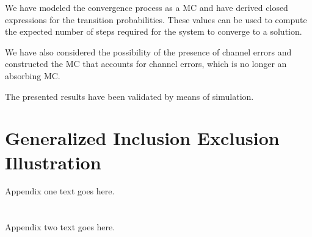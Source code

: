 \documentclass[journal]{IEEEtran}
\begin{document}
We have modeled the convergence process as a MC and have derived closed expressions for the transition probabilities.
These values can be used to compute the expected number of steps required for the system to converge to a solution.

We have also considered the possibility of the presence of channel errors and constructed the MC that accounts for channel errors, which is no longer an absorbing MC.

The presented results have been validated by means of simulation.






%


\appendices
\section{Generalized Inclusion Exclusion Illustration}
\label{app:incl-excl-thm}
Appendix one text goes here.

\section{}
Appendix two text goes here.
\end{document}
